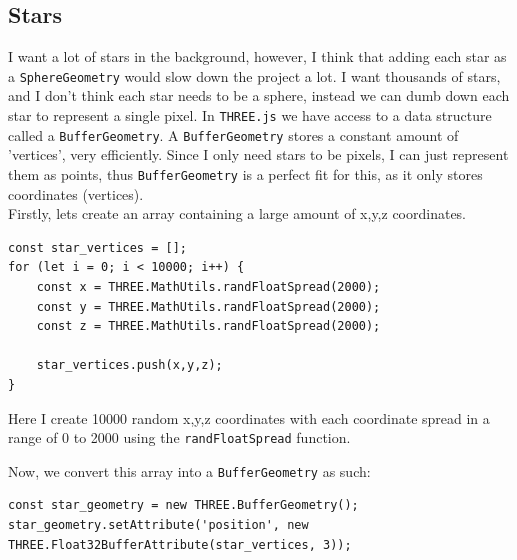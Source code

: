 \subsection{Stars}
I want a lot of stars in the background, however, I think that adding each star as a \verb|SphereGeometry| would slow down the project a lot. I want thousands of stars, and I don't think each star needs to be a sphere, instead we can dumb down each star to represent a single pixel. In \verb|THREE.js| we have access to a data structure called a \verb|BufferGeometry|. A \verb|BufferGeometry| stores a constant amount of 'vertices', very efficiently. Since I only need stars to be pixels, I can just represent them as points, thus \verb|BufferGeometry| is a perfect fit for this, as it only stores coordinates (vertices). \\
\newpage
Firstly, lets create an array containing a large amount of x,y,z coordinates.
\begin{lstlisting}
const star_vertices = [];
for (let i = 0; i < 10000; i++) {
    const x = THREE.MathUtils.randFloatSpread(2000);
    const y = THREE.MathUtils.randFloatSpread(2000);
    const z = THREE.MathUtils.randFloatSpread(2000);

    star_vertices.push(x,y,z);
}
\end{lstlisting}
Here I create 10000 random x,y,z coordinates with each coordinate spread in a range of 0 to 2000 using the \verb|randFloatSpread| function.

Now, we convert this array into a \verb|BufferGeometry| as such:
\begin{lstlisting}
const star_geometry = new THREE.BufferGeometry();
star_geometry.setAttribute('position', new THREE.Float32BufferAttribute(star_vertices, 3));
\end{lstlisting}

